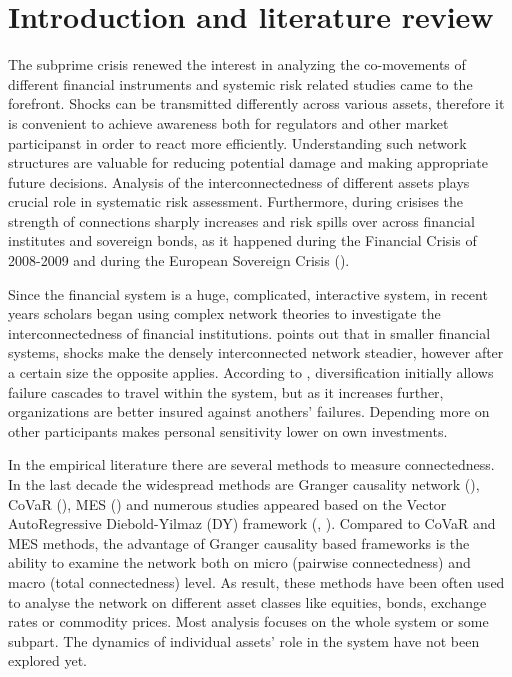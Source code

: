 \documentclass[12pt,bibliography=totoc]{article}
\begin{document}
\newpage

\section{Introduction and literature review}

The subprime crisis renewed the interest in analyzing the co-movements of different financial instruments and systemic risk related studies came to the forefront. Shocks can be transmitted differently across various assets, therefore it is convenient to achieve awareness both for regulators and other market participanst in order to react more efficiently. Understanding such network structures are valuable for reducing potential damage and making appropriate future decisions. Analysis of the interconnectedness of different assets plays crucial role in systematic risk assessment. Furthermore, during crisises the strength of connections sharply increases and risk spills over across financial institutes and sovereign bonds, as it happened during the Financial Crisis of 2008-2009 and during the European Sovereign Crisis (\cite{diebold2012better}). %

Since the financial system is a huge, complicated, interactive system, in recent years scholars began using complex network theories to investigate the interconnectedness of financial institutions. \cite{acemoglu2015systemic} points out that in smaller financial systems, shocks make the densely interconnected network steadier, however after a certain size the opposite applies. According to \cite{elliott2014financial}, diversification initially allows failure cascades to travel within the system, but as it increases further, organizations are better insured against anothers' failures. Depending more on other participants makes personal sensitivity lower on own investments. %

In the empirical literature there are several methods to measure connectedness. In the last decade the widespread methods are Granger causality network (\cite{billio2012econometric}), CoVaR (\cite{adrian2008federal}), MES (\cite{acharya2012capital}) and numerous studies appeared based on the Vector AutoRegressive Diebold-Yilmaz (DY) framework (\cite{diebold2009measuring}, \cite{diebold2012better}). Compared to CoVaR and MES methods, the advantage of Granger causality based frameworks is the ability to examine the network both on micro (pairwise connectedness) and macro (total connectedness) level. As result, these methods have been often used to analyse the network on different asset classes like equities, bonds, exchange rates or commodity prices. Most analysis focuses on the whole system or some subpart. The dynamics of individual assets' role in the system have not been explored yet. %
\end{document}
